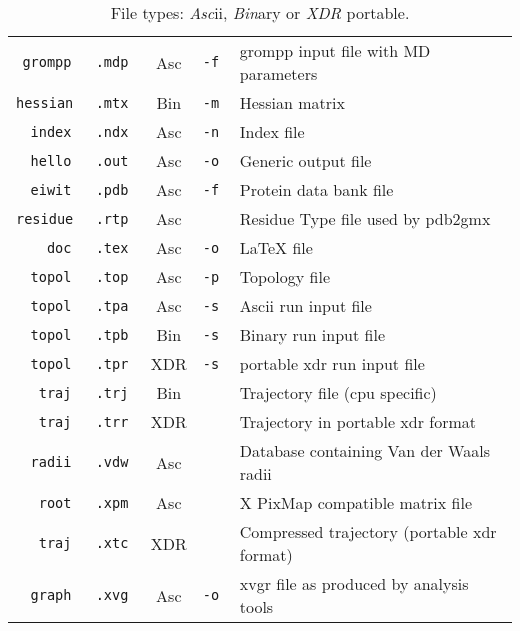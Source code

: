 \begin{table}[p]
\begin{tabularx}{\linewidth}{rlccX}
\tt  grompp &\tt .mdp & Asc &\tt -f & grompp input file with MD parameters \\
\tt hessian &\tt .mtx & Bin &\tt -m & Hessian matrix \\
\tt   index &\tt .ndx & Asc &\tt -n & Index file \\
\tt   hello &\tt .out & Asc &\tt -o & Generic output file \\
\tt   eiwit &\tt .pdb & Asc &\tt -f & Protein data bank file \\
\tt residue &\tt .rtp & Asc &\tt    & Residue Type file used by pdb2gmx \\
\tt     doc &\tt .tex & Asc &\tt -o & LaTeX file \\
\tt   topol &\tt .top & Asc &\tt -p & Topology file \\
\tt   topol &\tt .tpa & Asc &\tt -s & Ascii run input file \\
\tt   topol &\tt .tpb & Bin &\tt -s & Binary run input file \\
\tt   topol &\tt .tpr & XDR &\tt -s & portable xdr run input file \\
\tt    traj &\tt .trj & Bin &\tt    & Trajectory file (cpu specific) \\
\tt    traj &\tt .trr & XDR &\tt    & Trajectory in portable xdr format \\
\tt   radii &\tt .vdw & Asc &\tt    & Database containing Van der Waals radii \\
\tt    root &\tt .xpm & Asc &\tt    & X PixMap compatible matrix file \\
\tt    traj &\tt .xtc & XDR &\tt    & Compressed trajectory (portable xdr format)\\
\tt   graph &\tt .xvg & Asc &\tt -o & xvgr file as produced by analysis tools \\
\hline
\end{tabularx}
\caption{File types: {\em Asc\/}ii, {\em Bin\/}ary or {\em XDR\/} portable.}
\label{tab:form}
\end{table}
